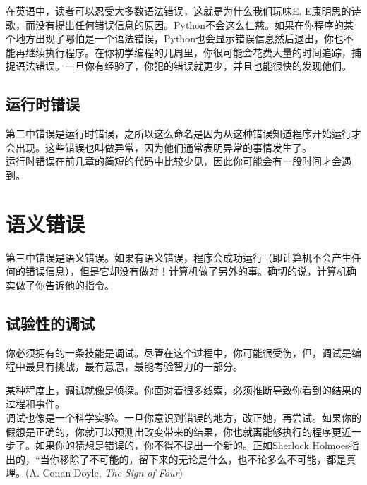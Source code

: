 在英语中，读者可以忍受大多数语法错误，这就是为什么我们玩味E. E康明思的诗歌，而没有提出任何错误信息的原因。Python不会这么仁慈。如果在你程序的某个地方出现了哪怕是一个语法错误，Python也会显示错误信息然后退出，你也不能再继续执行程序。在你初学编程的几周里，你很可能会花费大量的时间追踪，捕捉语法错误。一旦你有经验了，你犯的错误就更少，并且也能很快的发现他们。

\subsection{运行时错误}
\label{runtime 运行时}


第二中错误是运行时错误，之所以这么命名是因为从这种错误知道程序开始运行才会出现。这些错误也叫做异常，因为他们通常表明异常的事情发生了。\\

运行时错误在前几章的简短的代码中比较少见，因此你可能会有一段时间才会遇到。

\section{语义错误}

第三中错误是语义错误。如果有语义错误，程序会成功运行（即计算机不会产生任何的错误信息），但是它却没有做对！计算机做了另外的事。确切的说，计算机确实做了你告诉他的指令。

\subsection{试验性的调试}

你必须拥有的一条技能是调试。尽管在这个过程中，你可能很受伤，但，调试是编程中最具有挑战，最有意思，最能考验智力的一部分。\\


某种程度上，调试就像是侦探。你面对着很多线索，必须推断导致你看到的结果的过程和事件。\\

调试也像是一个科学实验。一旦你意识到错误的地方，改正她，再尝试。如果你的假想是正确的，你就可以预测出改变带来的结果，你也就离能够执行的程序更近一步了。如果你的猜想是错误的，你不得不提出一个新的。正如Sherlock Holmoes指出的，“当你移除了不可能的，留下来的无论是什么，也不论多么不可能，都是真理。(A. Conan Doyle, {\em The Sign of Four})\\

